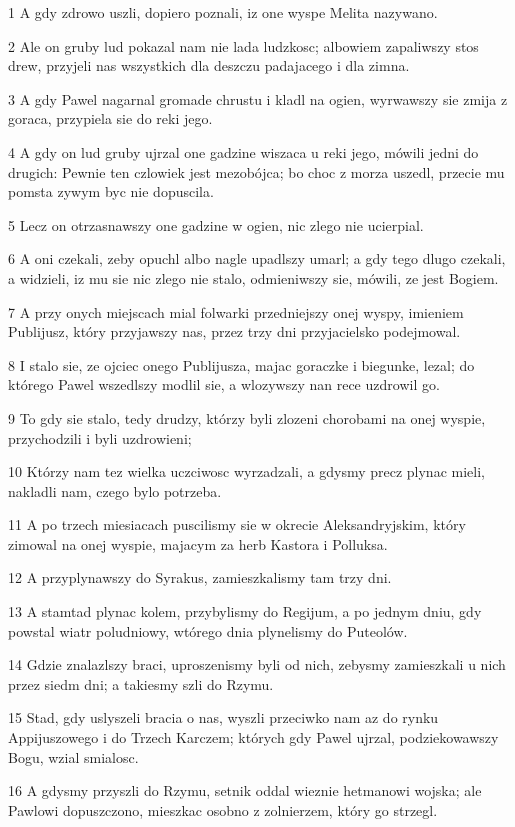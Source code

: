 \par 1 A gdy zdrowo uszli, dopiero poznali, iz one wyspe Melita nazywano.
\par 2 Ale on gruby lud pokazal nam nie lada ludzkosc; albowiem zapaliwszy stos drew, przyjeli nas wszystkich dla deszczu padajacego i dla zimna.
\par 3 A gdy Pawel nagarnal gromade chrustu i kladl na ogien, wyrwawszy sie zmija z goraca, przypiela sie do reki jego.
\par 4 A gdy on lud gruby ujrzal one gadzine wiszaca u reki jego, mówili jedni do drugich: Pewnie ten czlowiek jest mezobójca; bo choc z morza uszedl, przecie mu pomsta zywym byc nie dopuscila.
\par 5 Lecz on otrzasnawszy one gadzine w ogien, nic zlego nie ucierpial.
\par 6 A oni czekali, zeby opuchl albo nagle upadlszy umarl; a gdy tego dlugo czekali, a widzieli, iz mu sie nic zlego nie stalo, odmieniwszy sie, mówili, ze jest Bogiem.
\par 7 A przy onych miejscach mial folwarki przedniejszy onej wyspy, imieniem Publijusz, który przyjawszy nas, przez trzy dni przyjacielsko podejmowal.
\par 8 I stalo sie, ze ojciec onego Publijusza, majac goraczke i biegunke, lezal; do którego Pawel wszedlszy modlil sie, a wlozywszy nan rece uzdrowil go.
\par 9 To gdy sie stalo, tedy drudzy, którzy byli zlozeni chorobami na onej wyspie, przychodzili i byli uzdrowieni;
\par 10 Którzy nam tez wielka uczciwosc wyrzadzali, a gdysmy precz plynac mieli, nakladli nam, czego bylo potrzeba.
\par 11 A po trzech miesiacach puscilismy sie w okrecie Aleksandryjskim, który zimowal na onej wyspie, majacym za herb Kastora i Polluksa.
\par 12 A przyplynawszy do Syrakus, zamieszkalismy tam trzy dni.
\par 13 A stamtad plynac kolem, przybylismy do Regijum, a po jednym dniu, gdy powstal wiatr poludniowy, wtórego dnia plynelismy do Puteolów.
\par 14 Gdzie znalazlszy braci, uproszenismy byli od nich, zebysmy zamieszkali u nich przez siedm dni; a takiesmy szli do Rzymu.
\par 15 Stad, gdy uslyszeli bracia o nas, wyszli przeciwko nam az do rynku Appijuszowego i do Trzech Karczem; których gdy Pawel ujrzal, podziekowawszy Bogu, wzial smialosc.
\par 16 A gdysmy przyszli do Rzymu, setnik oddal wieznie hetmanowi wojska; ale Pawlowi dopuszczono, mieszkac osobno z zolnierzem, który go strzegl.
